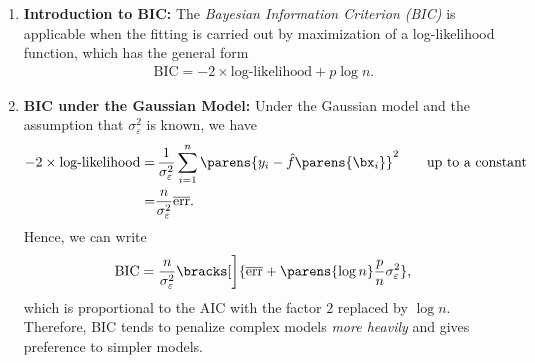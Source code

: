 \documentclass[12pt]{article}
\begin{document}
\begin{enumerate}[label=\textbf{\arabic*.}]

	\item \textbf{Introduction to BIC:} The \emph{Bayesian Information Criterion (BIC)} is applicable when the fitting is carried out by maximization of a log-likelihood function, which has the general form 
	\begin{align}\label{eq-bic-def}
		\mathrm{BIC} = -2 \times \text{log-likelihood} + p \log n. 
	\end{align}
	
	\item \textbf{BIC under the Gaussian Model:} Under the Gaussian model and the assumption that $\sigma_{\varepsilon}^2$ is known, we have 
	\begin{align*}
		-2 \times \text{log-likelihood} = & \, \frac{1}{\sigma_{\varepsilon}^2} \sum_{i=1}^n \parens{y_i - \hat{f} \parens{\bx_i}}^2 \qquad \text{up to a constant} \\ 
		= & \frac{n}{\sigma_{\varepsilon}^2} \overline{\mathrm{err}}. 
	\end{align*}
	Hence, we can write 
	\begin{align}
		\mathrm{BIC} = \frac{n}{\sigma_{\varepsilon}^2} \bracks[\bigg]{ \overline{\mathrm{err}} + \parens{\log n} \frac{p}{n}\sigma_{\varepsilon}^2 }, 
	\end{align}
	which is proportional to the AIC with the factor $2$ replaced by $\log n$. Therefore, BIC tends to penalize complex models \emph{more heavily} and gives preference to simpler models. 
	

\end{enumerate}
\end{document}
